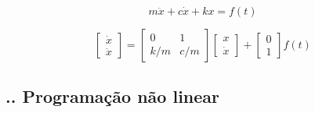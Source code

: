 \documentclass[aspectratio=169]{beamer}
\begin{document}
\begin{frame}
  \frametitle{\insertsubsection}

    \begin{equation}
      \label{eq:edo_ex}
      m \ddot x+c \dot x+kx = f(t)
  \end{equation}

  \begin{equation}
      \label{eq:espaco_de_estados_ex}
      \begin{bmatrix}
          \dot x \\
          \ddot x
      \end{bmatrix}
      =
      \begin{bmatrix}
          0 & 1 \\
          k/m & c/m
      \end{bmatrix}
      \begin{bmatrix}
          x \\
          \dot x
      \end{bmatrix}
      +
      \begin{bmatrix}
          0 \\
          1
      \end{bmatrix}
      f(t)
  \end{equation}
\end{frame}

\subsection{\insertsectionnumber .\insertsubsectionnumber . Programação não linear}
\end{document}
